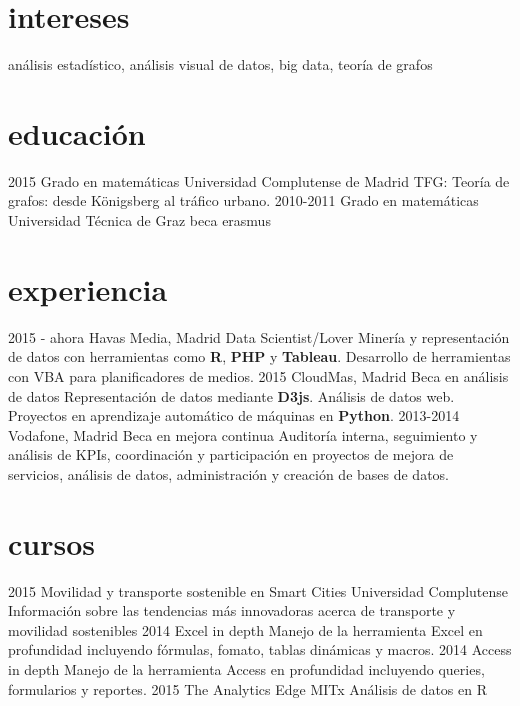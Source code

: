 \documentclass[]{friggeri-cv}
\begin{document}
\section{intereses}

análisis estadístico, análisis visual de datos, big data, teoría de grafos

\section{educación}

\begin{entrylist}
  \entry
    {2015}
    {Grado en matemáticas}
    {Universidad Complutense de Madrid}
    {TFG: Teoría de grafos: desde Königsberg al tráfico urbano.}
  \entry
    {2010-2011}
    {Grado en matemáticas}
    {Universidad Técnica de Graz}
    {beca erasmus}
\end{entrylist}

\section{experiencia}

\begin{entrylist}
  \entry
    {2015 - ahora}
    {Havas Media, Madrid}
    {Data Scientist/Lover}
    {Minería y representación de datos con herramientas como \textbf{R}, \textbf{PHP} y \textbf{Tableau}. Desarrollo de herramientas con VBA para planificadores de medios.}
  \entry
    {2015}
    {CloudMas, Madrid}
    {Beca en análisis de datos}
    {Representación de datos mediante \textbf{D3js}. Análisis de datos web. Proyectos en aprendizaje automático de máquinas en \textbf{Python}.}
  \entry
    {2013-2014}
    {Vodafone, Madrid}
    {Beca en mejora continua}
    {Auditoría interna, seguimiento y análisis de KPIs, coordinación y participación en proyectos de mejora de servicios, análisis de datos, administración y creación de bases de datos.}
\end{entrylist}

\section{cursos}

\begin{entrylist}
  \entry
    {2015}
    {Movilidad y transporte sostenible en Smart Cities}
    {Universidad Complutense}
    {Información sobre las tendencias más innovadoras acerca de transporte y movilidad sostenibles}
  \entry
    {2014}
    {Excel in depth}
    {}
    {Manejo de la herramienta Excel en profundidad incluyendo fórmulas, fomato, tablas dinámicas y macros.}
  \entry
    {2014}
    {Access in depth}
    {}
    {Manejo de la herramienta Access en profundidad incluyendo queries, formularios y reportes.}
  \entry
    {2015}
    {The Analytics Edge}
    {MITx}
    {Análisis de datos en R}
\end{entrylist}
\end{document}
